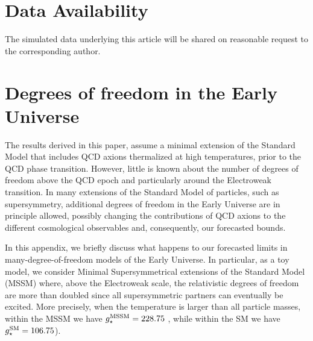 \documentclass[fleqn,usenatbib,letters]{mnras}
\begin{document}
\section*{Data Availability}
The simulated data underlying this article will be shared on reasonable request to the corresponding author.









\appendix

\section{Degrees of freedom in the Early Universe}
\label{AppendixA}


The results derived in this paper, assume a minimal extension of the Standard Model that includes QCD axions thermalized at high temperatures, prior to the QCD phase transition. However, little is known about the number of degrees of freedom above the QCD epoch and particularly around the Electroweak transition.  In many extensions of the Standard Model of particles, such as supersymmetry, additional degrees of freedom in the Early Universe are in principle allowed, possibly changing the contributions of QCD axions to the different cosmological observables and, consequently, our forecasted bounds.


In this appendix, we briefly discuss what happens to our forecasted limits in many-degree-of-freedom models of  the Early Universe. In particular, as a toy model, we consider  Minimal Supersymmetrical extensions of the Standard Model (MSSM) \cite{Ghodbane:2002kg} where, above the Electroweak scale, the relativistic degrees of freedom are more than doubled since all supersymmetric partners can eventually be excited. More precisely, when the temperature is larger than all particle masses, within the MSSM we have $g_{\star}^{\rm MSSM} = 228.75$ \citep{Schwarz:2003du}, while within the SM we have $g_{\star}^{\rm SM} = 106.75$).
\end{document}
